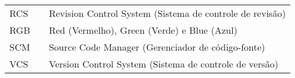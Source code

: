 \begin{tabular}{lll}
RCS & \hspace{1cm} & Revision Control System (Sistema de controle de revisão) \\

RGB & \hspace{1cm} & Red (Vermelho), Green (Verde) e Blue (Azul) \\

SCM & \hspace{1cm} & Source Code Manager (Gerenciador de código-fonte) \\

VCS & \hspace{1cm} & Version Control System (Sistema de controle de versão) \\

\end{tabular}